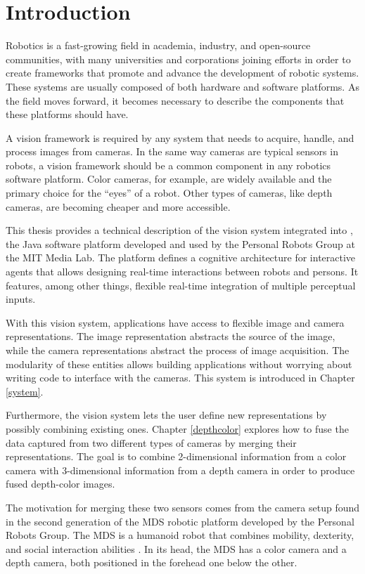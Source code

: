 \chapter{Introduction} \label{introduction}

Robotics is a fast-growing field in academia, industry, and open-source communities, with many universities 
and corporations joining efforts in order to create frameworks that promote and advance the development of 
robotic systems. These systems are usually composed of both hardware and software platforms. As the field 
moves forward, it becomes necessary to describe the components that these platforms should have.

A vision framework is required by any system that needs to acquire, handle, and process images from 
cameras. In the same way cameras are typical sensors in robots, a vision framework should be a common 
component in any robotics software platform. Color cameras, for example, are widely available and the primary 
choice for the ``eyes'' of a robot. Other types of cameras, like depth cameras, are becoming cheaper and more 
accessible. 

This thesis provides a technical description of the vision system integrated into \RD{}, the Java software
platform developed and used by the Personal Robots Group at the MIT Media Lab. The \RD{} platform defines 
a cognitive architecture for interactive agents that allows designing real-time interactions between robots and 
persons. It features, among other things, flexible real-time integration of multiple perceptual inputs.

With this vision system, \RD{} applications have access to flexible image and camera representations. The 
image representation abstracts the source of the image, while the camera representations abstract the process 
of image acquisition. The modularity of these entities allows building applications without worrying about writing
code to interface with the cameras. This system is introduced in Chapter \ref{system}. 

Furthermore, the vision system lets the user define new representations by possibly combining existing ones.
Chapter \ref{depthcolor} explores how to fuse the data captured from two different types of 
cameras by merging their representations. The goal is to combine 2-dimensional information from a color 
camera with 3-dimensional information from a depth camera in order to produce fused depth-color images.

The motivation for merging these two sensors comes from the camera setup found in the second generation 
of the MDS robotic platform developed by the Personal Robots Group. The MDS is a humanoid robot that 
combines mobility, dexterity, and social interaction abilities \cite{MDS}. In its head, the MDS has a color camera
and a depth camera, both positioned in the forehead one below the other. 

